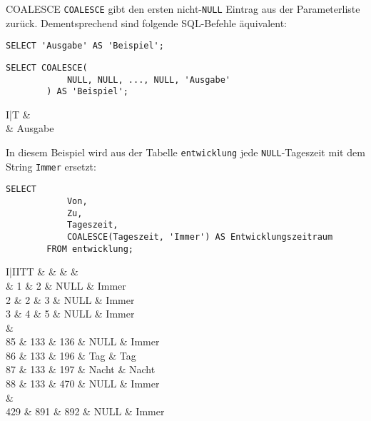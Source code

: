 \begin{sql}{COALESCE}
    \texttt{COALESCE} gibt den ersten nicht-\texttt{NULL} Eintrag aus der Parameterliste zurück.
    Dementsprechend sind folgende SQL-Befehle äquivalent:

    \begin{lstlisting}[language=mysql]
        SELECT 'Ausgabe' AS 'Beispiel';
    \end{lstlisting}

    \begin{lstlisting}[language=mysql]
        SELECT COALESCE(
            NULL, NULL, ..., NULL, 'Ausgabe'
        ) AS 'Beispiel';
    \end{lstlisting}

    \setcounter{rownum}{0}
    \begin{tabular}{I|T}
        &  \\ & Ausgabe \\
    \end{tabular}

    In diesem Beispiel wird aus der Tabelle \texttt{entwicklung} jede \texttt{NULL}-Tageszeit mit dem String \texttt{Immer} ersetzt:

    \begin{lstlisting}[language=mysql]
        SELECT
            Von,
            Zu,
            Tageszeit,
            COALESCE(Tageszeit, 'Immer') AS Entwicklungszeitraum
        FROM entwicklung;
    \end{lstlisting}

    \setcounter{rownum}{0}
    \begin{tabular}{I|IITT}
        &  &  &  &  \\ & 1 & 2 & NULL & Immer \\
        2 & 2 & 3 & NULL & Immer \\
        3 & 4 & 5 & NULL & Immer \\
         &  \\
        85 & 133 & 136 & NULL & Immer \\
        86 & 133 & 196 & Tag & Tag \\
        87 & 133 & 197 & Nacht & Nacht \\
        88 & 133 & 470 & NULL & Immer \\
         &  \\
        429 & 891 & 892 & NULL & Immer \\
    \end{tabular}
\end{sql}


